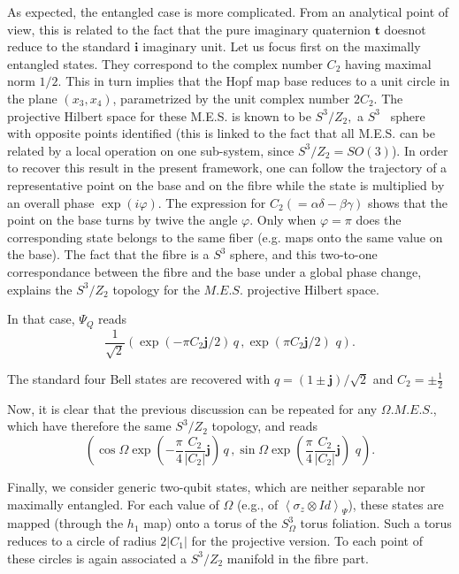 \documentclass{amsart}
\begin{document}
As expected, the entangled case is more complicated. From an analytical point
of view, this is related to the fact that the pure imaginary quaternion
$\mathbf{t}$ doesnot reduce to the standard $\mathbf{i}$ imaginary unit. Let
us focus first on the maximally entangled states. They correspond to the
complex number $C_{2}$ having maximal norm $1/2$. This in turn implies that
the Hopf map base reduces to a unit circle in the plane $\left(  x_{3}%
,x_{4}\right)  $, parametrized by the unit complex number $2C_{2}$. The
projective Hilbert space for these M.E.S. is known to be $S^{3}/Z_{2},$ a
$S^{3}$ \ sphere with opposite points identified \cite{2qbits_geometry} (this
is linked to the fact that all M.E.S. can be related by a local operation on
one sub-system, since $S^{3}/Z_{2}=SO(3)$). In order to recover this result in
the present framework, one can follow the trajectory of a representative point
on the base and on the fibre while the state is multiplied by an overall phase
$\exp\left(  i\varphi\right)  $. The expression for $C_{2}\left(
=\alpha\delta-\beta\gamma\right)  $ shows that the point on the base turns by
twive the angle $\varphi$. Only when $\varphi=\pi$ does the corresponding
state belongs to the same fiber (e.g. maps onto the same value on the base).
The fact that the fibre is a $S^{3}$ sphere, and this two-to-one
correspondance between the fibre and the base under a global phase change,
explains the $S^{3}/Z_{2}$ topology for the $M.E.S.$ projective Hilbert space.

In that case, $\Psi_{Q}$ reads%
\begin{equation}
\frac{1}{\sqrt{2}}(\exp\left(  -\pi C_{2}\mathbf{j}/2\right)  \,q\,,\exp
\left(  \pi C_{2}\mathbf{j}/2\right)  \,\,q).
\end{equation}

The standard four Bell states are recovered with $q=\left(  1\pm
\mathbf{j}\right)  /\sqrt{2}$ and $C_{2}=\pm%
\frac12
$

Now, it is clear that the previous discussion can be repeated for any
$\Omega.M.E.S.$, which have therefore the same $S^{3}/Z_{2}$ topology, and
reads%
\begin{equation}
(\cos\Omega\exp\left(  -\frac{\pi}{4}\frac{C_{2}}{\left|  C_{2}\right|
}\mathbf{j}\right)  \,q\,,\sin\Omega\exp\left(  \frac{\pi}{4}\frac{C_{2}%
}{\left|  C_{2}\right|  }\mathbf{j}\right)  \,\,q).
\end{equation}

Finally, we consider generic two-qubit states, which are neither separable nor
maximally entangled. For each value of $\Omega$ (e.g., of $\left\langle
\sigma_{z}\otimes Id\right\rangle _{\Psi}$), these states are mapped (through
the $h_{1}$ map) onto a torus of the $S_{\Omega}^{3}$ torus foliation. Such a
torus reduces to a circle of radius $2\left|  C_{1}\right|  $ for the
projective version. To each point of these circles is again associated a
$S^{3}/Z_{2}$ manifold in the fibre part.
\end{document}
